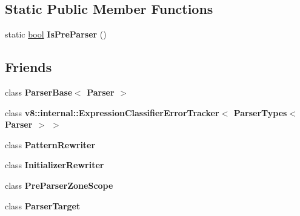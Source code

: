 \subsection*{Static Public Member Functions}
\begin{DoxyCompactItemize}
\item 
\mbox{\label{classv8_1_1internal_1_1Parser_a8b261f28da2f25b1e8f44bb849774ef4}} 
static \mbox{\hyperlink{classbool}{bool}} {\bfseries Is\+Pre\+Parser} ()
\end{DoxyCompactItemize}
\subsection*{Friends}
\begin{DoxyCompactItemize}
\item 
\mbox{\label{classv8_1_1internal_1_1Parser_afc69242dfa3444acf456dc297a778e31}} 
class {\bfseries Parser\+Base$<$ Parser $>$}
\item 
\mbox{\label{classv8_1_1internal_1_1Parser_a6945f4198235ca95e72869819339afae}} 
class {\bfseries v8\+::internal\+::\+Expression\+Classifier\+Error\+Tracker$<$ Parser\+Types$<$ Parser $>$ $>$}
\item 
\mbox{\label{classv8_1_1internal_1_1Parser_ad176235c91e9b3cd1c5d826507c73b31}} 
class {\bfseries Pattern\+Rewriter}
\item 
\mbox{\label{classv8_1_1internal_1_1Parser_aa0cd6e888d222bf4b9d65b67a8011e59}} 
class {\bfseries Initializer\+Rewriter}
\item 
\mbox{\label{classv8_1_1internal_1_1Parser_ae91175f36dbfc9486fc551dc2a8c634d}} 
class {\bfseries Pre\+Parser\+Zone\+Scope}
\item 
\mbox{\label{classv8_1_1internal_1_1Parser_ab4c50cf2cd55ecf29dfa76c165343021}} 
class {\bfseries Parser\+Target}
\item 
\mbox{\label{classv8_1_1internal_1_1Parser_adaee694825d204980325732bdc0b5428}} 

\end{DoxyCompactItemize}
